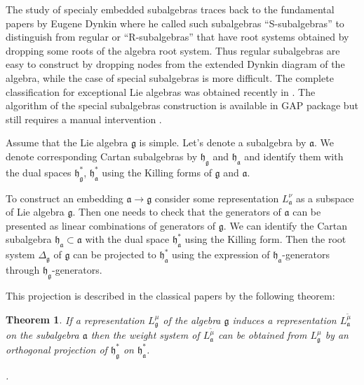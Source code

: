 \documentclass[12pt]{iopart}
\newtheorem{theorem}{Theorem}
\newcommand{\gf}{\mathfrak{g}}
\newcommand{\af}{\mathfrak{a}}
\newcommand{\hf}{\mathfrak{h}}
\newcommand{\hfg}{\hf_{\gf}}
\newcommand{\hfa}{\hf_{\af}}
\begin{document}
The study of specialy embedded subalgebras traces back to the fundamental papers by Eugene Dynkin
\cite{dynkin1952semisimple,dynkin1952maximal} where he called such subalgebras ``S-subalgebras'' to
distinguish from regular or ``R-subalgebras'' that have root systems obtained by dropping some roots
of the algebra root system. Thus regular subalgebras are easy to construct by dropping nodes from
the extended Dynkin diagram of the algebra, while the case of special subalgebras is more difficult. The complete
classification for exceptional Lie algebras was obtained recently in \cite{minchenko2006semisimple}.
The algorithm of the special subalgebras construction is available in GAP package but still requires
a manual intervention \cite{de2011constructing}.  

Assume that the Lie algebra $\gf$ is simple. Let's denote a subalgebra by
$\af$. We denote corresponding Cartan subalgebras by $\hfg$ and $\hfa$ and identify them with the dual
spaces $\hfg^{*}$, $\hfa^{*}$ using the Killing forms of $\gf$ and $\af$.

To construct an embedding $\af\to\gf$ consider some representation $L^{\nu}_{\af}$ as a subspace of
Lie algebra $\gf$. Then one needs to check that the generators of $\af$ can be presented as
linear combinations of generators of $\gf$. We can identify the Cartan subalgebra $\hfa\subset \af$ with
the dual space $\hfa^{*}$ using the Killing form. Then the root system $\Delta_{\gf}$ of $\gf$ can be
projected to $\hfa^{*}$ using the expression of $\hfa$-generators through $\hfg$-generators.


This projection is described in the classical papers \cite{dynkin1952semisimple,dynkin1952maximal} by the following theorem:

\begin{theorem}\label{dyn0}
  If a representation $L^{\mu}_{\gf}$ of the algebra $\gf$ induces a representation
  $L^{\tilde\mu}_{\af}$ on the subalgebra $\af$ then the weight system of $L^{\tilde\mu}_{\af}$ can
  be obtained from $L^{\mu}_{\gf}$ by an orthogonal projection of $\hfg^{*}$ on $\hfa^{*}$.

  \cite{dynkin1952maximal}. 
\end{theorem} 
\end{document}
